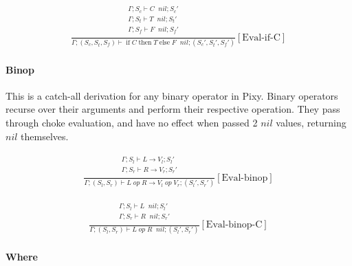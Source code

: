 \documentclass{scrartcl}
\DeclareMathOperator{\ifop}{if}
\DeclareMathOperator{\thenop}{then}
\DeclareMathOperator{\elseop}{else}
\DeclareMathOperator{\ceval}{\overset{C}{\rightarrow}}
\begin{document}
    \begin{align*}
    \frac{
        \begin{matrix}
        \Gamma; S_c \vdash C \ceval nil; S_c' \\
        \Gamma; S_t \vdash T \ceval nil; S_t' \\
        \Gamma; S_f \vdash F \ceval nil; S_f' \\
        \end{matrix}
    }{
        \Gamma; (S_c, S_t, S_f) \vdash \ifop C \thenop T \elseop F \ceval nil; (S_c', S_t', S_f')
    }[\text{Eval-if-C}]
    \end{align*}
    
    \paragraph{Binop}
    
    This is a catch-all derivation for any binary operator in Pixy. Binary operators recurse over their arguments and perform their respective operation. They pass through choke evaluation, and have no effect when passed 2 $nil$ values, returning $nil$ themselves.
    
    \begin{align*}
    \frac{
        \begin{matrix}
        \Gamma; S_l \vdash L \rightarrow V_l; S_l' \\
        \Gamma; S_r \vdash R \rightarrow V_r; S_r' \\
        \end{matrix}
    }{
        \Gamma; (S_l, S_r) \vdash L \; op \; R \rightarrow V_l \; op \; V_r; (S_l', S_r')
    }[\text{Eval-binop}]
    \end{align*}
    
    \begin{align*}
    \frac{
        \begin{matrix}
        \Gamma; S_l \vdash L \ceval nil; S_l' \\
        \Gamma; S_r \vdash R \ceval nil; S_r' \\
        \end{matrix}
    }{
        \Gamma; (S_l, S_r) \vdash L \; op \; R \ceval nil; (S_l', S_r')
    }[\text{Eval-binop-C}]
    \end{align*}
    
    \paragraph{Where}
    
\end{document}
